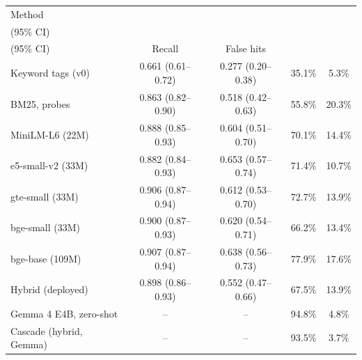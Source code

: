 \begin{tabular*}{\textwidth}{@{\extracolsep{\fill}}lcccc@{}}
\toprule
Method & \begin{tabular}{@{}c@{}}Risk AUROC\\(95\% CI)\end{tabular} & \begin{tabular}{@{}c@{}}Risk AUPRC\\(95\% CI)\end{tabular} & Recall & False hits\\
\midrule
Keyword tags (v0) & 0.661 (0.61--0.72) & 0.277 (0.20--0.38) & 35.1\% & 5.3\%\\
BM25, probes & 0.863 (0.82--0.90) & 0.518 (0.42--0.63) & 55.8\% & 20.3\%\\
MiniLM-L6 (22M) & 0.888 (0.85--0.93) & 0.604 (0.51--0.70) & 70.1\% & 14.4\%\\
e5-small-v2 (33M) & 0.882 (0.84--0.93) & 0.653 (0.57--0.74) & 71.4\% & 10.7\%\\
gte-small (33M) & 0.906 (0.87--0.94) & 0.612 (0.53--0.70) & 72.7\% & 13.9\%\\
bge-small (33M) & 0.900 (0.87--0.93) & 0.620 (0.54--0.71) & 66.2\% & 13.4\%\\
bge-base (109M) & 0.907 (0.87--0.94) & 0.638 (0.56--0.73) & 77.9\% & 17.6\%\\
Hybrid (deployed) & 0.898 (0.86--0.93) & 0.552 (0.47--0.66) & 67.5\% & 13.9\%\\
\midrule
Gemma 4 E4B, zero-shot & -- & -- & 94.8\% & 4.8\%\\
Cascade (hybrid, Gemma) & -- & -- & 93.5\% & 3.7\%\\
\bottomrule
\end{tabular*}

